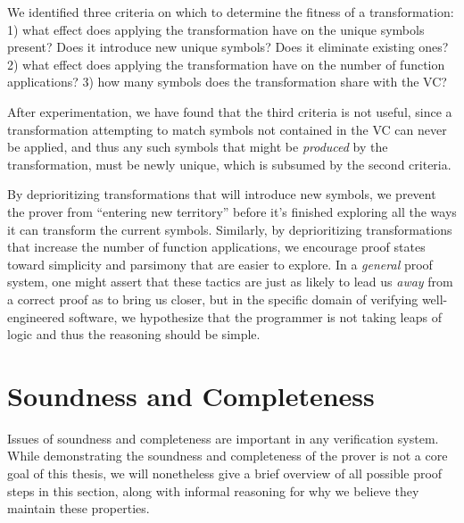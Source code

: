 We identified three criteria on which to determine the fitness of a transformation: 1) what effect does applying the transformation have on the unique symbols present?  Does it introduce new unique symbols?  Does it eliminate existing ones? 2) what effect does applying the transformation have on the number of function applications? 3) how many symbols does the transformation share with the VC?

After experimentation, we have found that the third criteria is not useful, since a transformation attempting to match symbols not contained in the VC can never be applied, and thus any such symbols that might be \emph{produced} by the transformation, must be newly unique, which is subsumed by the second criteria.

By deprioritizing transformations that will introduce new symbols, we prevent the prover from ``entering new territory'' before it's finished exploring all the ways it can transform the current symbols.  Similarly, by deprioritizing transformations that increase the number of function applications, we encourage proof states toward simplicity and parsimony that are easier to explore.  In a \emph{general} proof system, one might assert that these tactics are just as likely to lead us \emph{away} from a correct proof as to bring us closer, but in the specific domain of verifying well-engineered software, we hypothesize that the programmer is not taking leaps of logic and thus the reasoning should be simple.


\section{Soundness and Completeness}
Issues of soundness and completeness are important in any verification system.  While demonstrating the soundness and completeness of the prover is not a core goal of this thesis, we will nonetheless give a brief overview of all possible proof steps in this section, along with informal reasoning for why we believe they maintain these properties.

